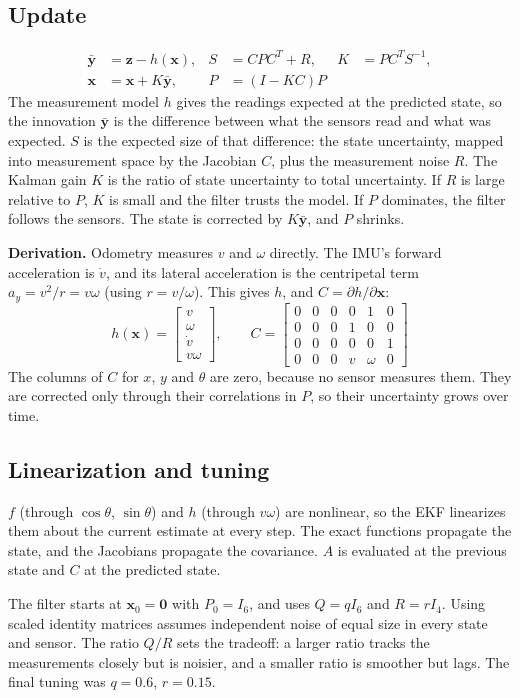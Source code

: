 \documentclass[11pt]{article}
\begin{document}
\subsection*{Update}
\begin{align*}
\bar{\bm{y}} &= \bm{z} - h(\bm{x}), & S &= CPC^T + R, & K &= PC^TS^{-1}, \\
\bm{x} &= \bm{x} + K\bar{\bm{y}}, & P &= (I - KC)P
\end{align*}
The measurement model $h$ gives the readings expected at the predicted state, so the
innovation $\bar{\bm{y}}$ is the difference between what the sensors read and what was
expected. $S$ is the expected size of that difference: the state uncertainty, mapped into
measurement space by the Jacobian $C$, plus the measurement noise $R$. The Kalman gain
$K$ is the ratio of state uncertainty to total uncertainty. If $R$ is large relative to
$P$, $K$ is small and the filter trusts the model. If $P$ dominates, the filter follows
the sensors. The state is corrected by $K\bar{\bm{y}}$, and $P$ shrinks.

\textbf{Derivation.} Odometry measures $v$ and $\omega$ directly. The IMU's forward
acceleration is $\dot v$, and its lateral acceleration is the centripetal term
$a_y = v^2/r = v\omega$ (using $r = v/\omega$). This gives $h$, and $C = \partial h/\partial\bm{x}$:
\begin{equation*}
h(\bm{x}) =
\begin{bmatrix} v \\ \omega \\ \dot v \\ v\omega \end{bmatrix},
\qquad
C =
\begin{bmatrix}
0 & 0 & 0 & 0 & 1 & 0\\
0 & 0 & 0 & 1 & 0 & 0\\
0 & 0 & 0 & 0 & 0 & 1\\
0 & 0 & 0 & v & \omega & 0
\end{bmatrix}
\end{equation*}
The columns of $C$ for $x$, $y$ and $\theta$ are zero, because no sensor measures them.
They are corrected only through their correlations in $P$, so their uncertainty grows
over time.

\subsection*{Linearization and tuning}
$f$ (through $\cos\theta$, $\sin\theta$) and $h$ (through $v\omega$) are nonlinear, so the
EKF linearizes them about the current estimate at every step. The exact functions
propagate the state, and the Jacobians propagate the covariance. $A$ is evaluated at the
previous state and $C$ at the predicted state.

The filter starts at $\bm{x}_0 = \bm{0}$ with $P_0 = I_6$, and uses
$Q = q I_6$ and $R = r I_4$. Using scaled identity matrices assumes independent noise of
equal size in every state and sensor. The ratio $Q/R$ sets the tradeoff: a larger ratio
tracks the measurements closely but is noisier, and a smaller ratio is smoother but lags.
The final tuning was $q = 0.6$, $r = 0.15$.
\end{document}
